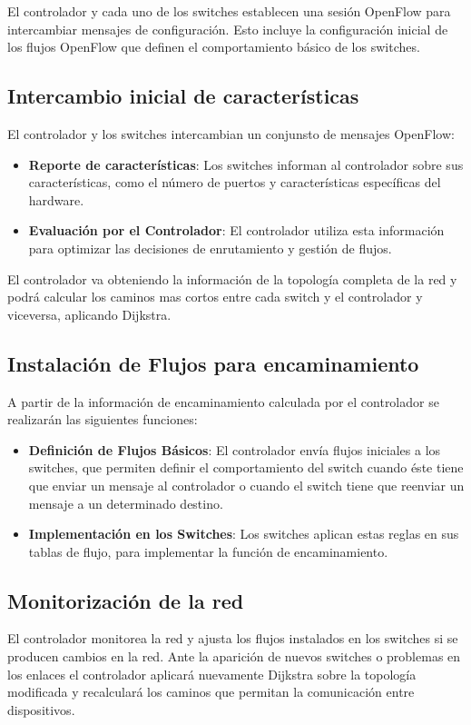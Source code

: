 \documentclass[a4paper, 12pt]{book}
\begin{document}
	
	El controlador y cada uno de los switches establecen una sesión OpenFlow para intercambiar mensajes de configuración. Esto incluye la configuración inicial de los flujos OpenFlow que definen el comportamiento básico de los switches.

	
	\subsection{Intercambio inicial de características}
	El controlador y los switches intercambian un conjunsto de mensajes OpenFlow:
	\begin{itemize}
		\item \textbf{Reporte de características}: Los switches informan al controlador sobre sus características, como el número de puertos y características específicas del hardware.
		\item \textbf{Evaluación por el Controlador}: El controlador utiliza esta información para optimizar las decisiones de enrutamiento y gestión de flujos.
	\end{itemize}
	
	El controlador va obteniendo la información de la topología completa de la red y podrá calcular los caminos mas cortos entre cada switch y el controlador y viceversa, aplicando Dijkstra.
	
	\subsection{Instalación de Flujos para encaminamiento}
	A partir de la información de encaminamiento calculada por el controlador se realizarán las siguientes funciones:
	\begin{itemize}
		\item \textbf{Definición de Flujos Básicos}: El controlador envía flujos iniciales a los switches, que permiten definir el comportamiento del switch cuando éste tiene que enviar un mensaje al controlador o cuando el switch tiene que reenviar un mensaje a un determinado destino.
		\item \textbf{Implementación en los Switches}: Los switches aplican estas reglas en sus tablas de flujo, para implementar la función de encaminamiento.
	\end{itemize}
	
	\subsection{Monitorización de la red}
		El controlador monitorea la red y ajusta los flujos instalados en los switches si se producen cambios en la red.
		Ante la aparición de nuevos switches o problemas en los enlaces el controlador aplicará nuevamente Dijkstra sobre la topología modificada y recalculará los caminos que permitan la comunicación entre dispositivos.
	
\end{document}

